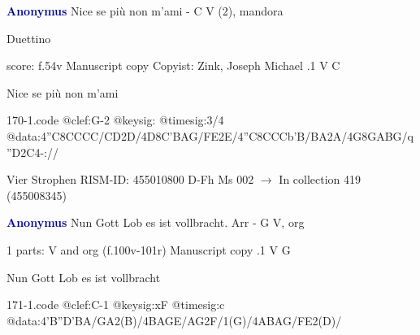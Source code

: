 \documentclass[twocolumn]{book}
\begin{document}
\newline \par \vspace{7pt} \textcolor{darkblue}{\textbf{Anonymus  }}
\newline Nice se più non m'ami - C
\newline V (2), mandora
\newline \begin{itshape}[at left, f.54v:] Duettino\end{itshape} 
\newline \textcolor{darkblue}{}  score: f.54v
\newline Manuscript copy
\newline Copyist: Zink, Joseph Michael
.1  V  C
\newline \begin{footnotesize} Nice se più non m'ami \end{footnotesize}  
\begin{filecontents*}{170-1.code}
@clef:G-2
@keysig:
@timesig:3/4
@data:4''C8CCCC/{CD}2D/4D8C'BAG/{FE}2E/4''C8CCCb'B/{BA}2A/4G8GABG/q''D2C4-://
\end{filecontents*}
\newline
%

\newline Vier Strophen
\newline RISM-ID: 455010800
\newline D-Fh  Ms 002
\newline $\rightarrow$ In collection 419 (455008345)
      
\newline \par \vspace{7pt} \textcolor{darkblue}{\textbf{Anonymus  }}
\newline Nun Gott Lob es ist vollbracht. Arr - G
\newline V, org
\newline \begin{itshape}\end{itshape} 
\newline \textcolor{darkblue}{}  1 parts: V and org  (f.100v-101r)
\newline Manuscript copy
.1  V  G
\newline \begin{footnotesize} Nun Gott Lob es ist vollbracht \end{footnotesize}  
\begin{filecontents*}{171-1.code}
@clef:C-1
@keysig:xF
@timesig:c
@data:4'B''D'BA/GA2(B)/4BAGE/AG2F/1(G)/4ABAG/FE2(D)/
\end{filecontents*}
\newline
%
\end{document}
